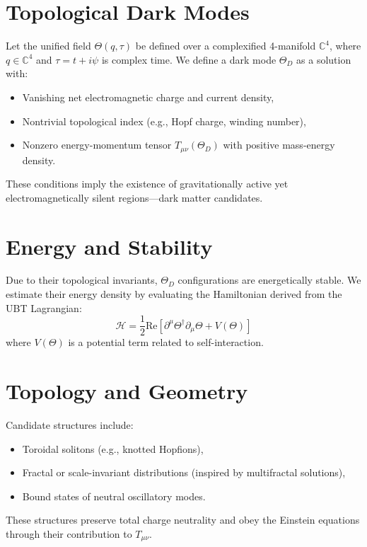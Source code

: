 \section{Topological Dark Modes}
Let the unified field \( \Theta(q, \tau) \) be defined over a complexified 4-manifold \( \mathbb{C}^4 \), where \( q \in \mathbb{C}^4 \) and \( \tau = t + i\psi \) is complex time. We define a dark mode \( \Theta_D \) as a solution with:

\begin{itemize}
  \item Vanishing net electromagnetic charge and current density,
  \item Nontrivial topological index (e.g., Hopf charge, winding number),
  \item Nonzero energy-momentum tensor \( T_{\mu\nu}(\Theta_D) \) with positive mass-energy density.
\end{itemize}

These conditions imply the existence of gravitationally active yet electromagnetically silent regions—dark matter candidates.

\section{Energy and Stability}
Due to their topological invariants, \( \Theta_D \) configurations are energetically stable. We estimate their energy density by evaluating the Hamiltonian derived from the UBT Lagrangian:
\begin{equation}
\mathcal{H} = \frac{1}{2} \text{Re} \left[ \partial^\mu \Theta^\dagger \partial_\mu \Theta + V(\Theta) \right]
\end{equation}
where \( V(\Theta) \) is a potential term related to self-interaction.

\section{Topology and Geometry}
Candidate structures include:
\begin{itemize}
  \item Toroidal solitons (e.g., knotted Hopfions),
  \item Fractal or scale-invariant distributions (inspired by multifractal solutions),
  \item Bound states of neutral oscillatory modes.
\end{itemize}

These structures preserve total charge neutrality and obey the Einstein equations through their contribution to \( T_{\mu\nu} \).

